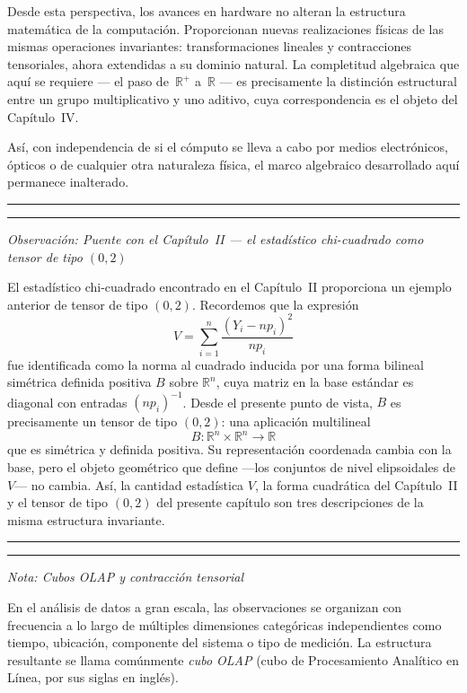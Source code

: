 \medskip

Desde esta perspectiva, los avances en hardware no alteran la estructura
matemática de la computación.
Proporcionan nuevas realizaciones físicas de las mismas operaciones
invariantes: transformaciones lineales y contracciones tensoriales, ahora
extendidas a su dominio natural.
La completitud algebraica que aquí se requiere --- el paso
de~$\mathbb{R}^+$ a~$\mathbb{R}$ --- es precisamente la distinción estructural
entre un grupo multiplicativo y uno aditivo, cuya correspondencia es el objeto
del Capítulo~IV.

\medskip

Así, con independencia de si el cómputo se lleva a cabo por medios
electrónicos, ópticos o de cualquier otra naturaleza física, el marco
algebraico desarrollado aquí permanece inalterado.

\medskip
\hrule
\bigskip

\bigskip
\hrule
\medskip

\textit{Observación: Puente con el Capítulo~II --- el estadístico chi-cuadrado
como tensor de tipo $(0,2)$}

\medskip

El estadístico chi-cuadrado encontrado en el Capítulo~II proporciona un ejemplo
anterior de tensor de tipo $(0,2)$.
Recordemos que la expresión
\[
V
=
\sum_{i=1}^{n}
\frac{(Y_i - np_i)^2}{np_i}
\]
fue identificada como la norma al cuadrado inducida por una forma bilineal
simétrica definida positiva $B$ sobre $\mathbb{R}^n$, cuya matriz en la base
estándar es diagonal con entradas $(np_i)^{-1}$.
Desde el presente punto de vista, $B$ es precisamente un tensor de tipo $(0,2)$:
una aplicación multilineal
\[
B : \mathbb{R}^n \times \mathbb{R}^n \longrightarrow \mathbb{R}
\]
que es simétrica y definida positiva.
Su representación coordenada cambia con la base, pero el objeto geométrico que
define ---los conjuntos de nivel elipsoidales de $V$--- no cambia.
Así, la cantidad estadística $V$, la forma cuadrática del Capítulo~II y el
tensor de tipo $(0,2)$ del presente capítulo son tres descripciones de la
misma estructura invariante.

\medskip
\hrule
\bigskip

\bigskip
\hrule
\medskip

\textit{Nota: Cubos OLAP y contracción tensorial}

\medskip

En el análisis de datos a gran escala, las observaciones se organizan con
frecuencia a lo largo de múltiples dimensiones categóricas independientes como
tiempo, ubicación, componente del sistema o tipo de medición.
La estructura resultante se llama comúnmente \emph{cubo OLAP} (cubo de
Procesamiento Analítico en Línea, por sus siglas en inglés).

